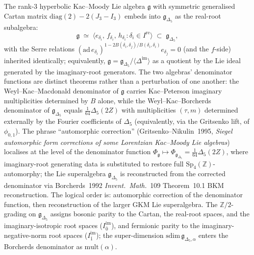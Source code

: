 \begin{remark}
\label{rem:qgf-g-as-real-root-subalgebra}
The rank-$3$ hyperbolic Kac--Moody Lie algebra $\mathfrak g$
with symmetric generalised Cartan matrix
$\mathrm{diag}(2) - 2(J_3-I_3)$ embeds into $\mathfrak g_{\Delta_5}$
as the real-root subalgebra:
\[
 \mathfrak g \;\simeq\; \bigl\langle e_{\delta_i},\, f_{\delta_i},\,
 h_{\delta_i} : \delta_i \in I^{\mathrm{re}}\bigr\rangle
 \;\subset\; \mathfrak g_{\Delta_5},
\]
with the Serre relations
$(\mathrm{ad}\,e_{\delta_i})^{1-2B(\delta_i,\delta_j)/B(\delta_i,\delta_i)}
e_{\delta_j}=0$ (and the $f$-side) inherited identically; equivalently,
$\mathfrak g = \mathfrak g_{\Delta_5}/\langle\Delta^{\mathrm{im}}\rangle$
as a quotient by the Lie ideal generated by the imaginary-root
generators. The two algebras' denominator functions are distinct
theorems rather than a perturbation of one another: the
Weyl--Kac--Macdonald denominator of $\mathfrak g$ carries
Kac--Peterson imaginary multiplicities determined by $B$ alone,
while the Weyl--Kac--Borcherds denominator of $\mathfrak g_{\Delta_5}$
equals $\frac{1}{64}\Delta_5(2Z)$ with multiplicities $(\tau,m)$
determined externally by the Fourier coefficients of $\Delta_5$
(equivalently, via the Gritsenko lift, of $\phi_{0,1}$).
The phrase ``automorphic correction''
(Gritsenko--Nikulin~1995, \emph{Siegel automorphic form corrections
of some Lorentzian Kac--Moody Lie algebras}) localises at the level
of the denominator function
$\Phi_{\mathfrak g}\mapsto\Phi_{\mathfrak g_{\Delta_5}}
=\frac{1}{64}\Delta_5(2Z)$, where imaginary-root generating data is
substituted to restore full $\mathrm{Sp}_4(\mathbb Z)$-automorphy; the
Lie superalgebra $\mathfrak g_{\Delta_5}$ is reconstructed from the
corrected denominator via Borcherds~1992 \emph{Invent.~Math.}~109
Theorem~10.1 BKM reconstruction. The logical order is: automorphic
correction of the denominator function, then reconstruction of the
larger GKM Lie superalgebra. The $\mathbb Z/2$-grading on
$\mathfrak g_{\Delta_5}$ assigns bosonic parity to the Cartan, the
real-root spaces, and the imaginary-isotropic root spaces
($I^{\mathrm{im}}_{\bar 0}$), and fermionic parity to the
imaginary-negative-norm root spaces ($I^{\mathrm{im}}_{\bar 1}$); the
super-dimension $\mathrm{sdim}\,\mathfrak g_{\Delta_5,\alpha}$ enters
the Borcherds denominator as $\mathrm{mult}(\alpha)$.
\end{remark}

